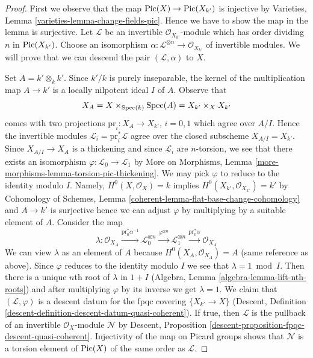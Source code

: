 \begin{proof}
First we observe that the map $\mathop{\mathrm{Pic}}\nolimits(X) \to \mathop{\mathrm{Pic}}\nolimits(X_{k'})$
is injective by Varieties, Lemma \ref{varieties-lemma-change-fields-pic}.
Hence we have to show the map in the lemma is surjective.
Let $\mathcal{L}$ be an invertible $\mathcal{O}_{X_{k'}}$-module
which has order dividing $n$ in $\mathop{\mathrm{Pic}}\nolimits(X_{k'})$.
Choose an isomorphism
$\alpha : \mathcal{L}^{\otimes n} \to \mathcal{O}_{X_{k'}}$
of invertible modules.
We will prove that we can descend the pair $(\mathcal{L}, \alpha)$
to $X$.

\medskip\noindent
Set $A = k' \otimes_k k'$. Since $k'/k$ is purely inseparable,
the kernel of the multiplication map $A \to k'$ is a
locally nilpotent ideal $I$ of $A$. Observe that
$$
X_A = X \times_{\mathop{\mathrm{Spec}}(k)} \mathop{\mathrm{Spec}}(A) = X_{k'} \times_X X_{k'}
$$
comes with two projections $\text{pr}_i : X_A \to X_{k'}$, $i = 0, 1$
which agree over $A/I$. Hence the invertible modules
$\mathcal{L}_i = \text{pr}_i^*\mathcal{L}$
agree over the closed subscheme $X_{A/I} = X_{k'}$.
Since $X_{A/I} \to X_A$ is a thickening and since
$\mathcal{L}_i$ are $n$-torsion, we see that there
exists an isomorphism $\varphi : \mathcal{L}_0 \to \mathcal{L}_1$ by
More on Morphisms, Lemma \ref{more-morphisms-lemma-torsion-pic-thickening}.
We may pick $\varphi$ to reduce to the identity modulo $I$. Namely,
$H^0(X, \mathcal{O}_X) = k$ implies
$H^0(X_{k'}, \mathcal{O}_{X_{k'}}) = k'$ by
Cohomology of Schemes, Lemma \ref{coherent-lemma-flat-base-change-cohomology}
and $A \to k'$ is surjective hence we can adjust $\varphi$ by multiplying by
a suitable element of $A$. Consider the map
$$
\lambda : \mathcal{O}_{X_A}
\xrightarrow{\text{pr}_0^*\alpha^{-1}}
\mathcal{L}_0^{\otimes n}
\xrightarrow{\varphi^{\otimes n}}
\mathcal{L}_1^{\otimes n}
\xrightarrow{\text{pr}_0^*\alpha}
\mathcal{O}_{X_A}
$$
We can view $\lambda$ as an element of $A$ because
$H^0(X_A, \mathcal{O}_{X_A}) = A$ (same reference as above).
Since $\varphi$ reduces to the identity modulo $I$ we
see that $\lambda = 1 \bmod I$. Then there is a unique
$n$th root of $\lambda$ in $1 + I$
(Algebra, Lemma \ref{algebra-lemma-lift-nth-roots})
and after multiplying $\varphi$ by its inverse we get $\lambda = 1$.
We claim that $(\mathcal{L}, \varphi)$ is a descent datum
for the fpqc covering $\{X_{k'} \to X\}$
(Descent, Definition \ref{descent-definition-descent-datum-quasi-coherent}).
If true, then $\mathcal{L}$ is the pullback of an invertible
$\mathcal{O}_X$-module $\mathcal{N}$ by
Descent, Proposition \ref{descent-proposition-fpqc-descent-quasi-coherent}.
Injectivity of the map on Picard groups shows that $\mathcal{N}$
is a torsion element of $\mathop{\mathrm{Pic}}\nolimits(X)$ of the same order as $\mathcal{L}$.


\end{proof}

